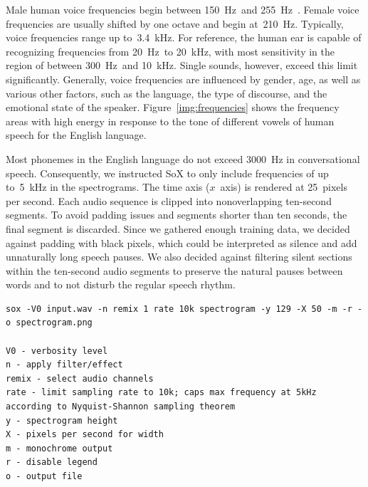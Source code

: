 	Male human voice frequencies begin between \SI{150}{\hertz}~and \SI{255}{\hertz}~\cite{traunmuller1993frequency}. Female voice frequencies are usually shifted by one octave and begin at~\SI{210}{\hertz}. Typically, voice frequencies range up to~\SI{3.4}{\kilo\hertz}. For reference, the human ear is capable of recognizing frequencies from \SI{20}{\hertz}~to \SI{20}{\kilo\hertz}, with most sensitivity in the region of between \SI{300}{\hertz}~and \SI{10}{\kilo\hertz}. Single sounds, however, exceed this limit significantly. Generally, voice frequencies are influenced by gender, age, as well as various other factors, such as the language, the type of discourse, and the emotional state of the speaker. Figure~\ref{img:frequencies} shows the frequency areas with high energy in response to the tone of different vowels of human speech for the English language.


Most phonemes in the English language do not exceed \SI{3000}{\hertz} in conversational speech.
Consequently, we instructed SoX to only include frequencies of up to~\SI{5}{\kilo\hertz} in the spectrograms.
The time axis ($x$~axis) is rendered at \num{25}~pixels per second. Each audio sequence is clipped into nonoverlapping ten-second segments. To avoid padding issues and segments shorter than ten seconds, the final segment is discarded. Since we gathered enough training data, we decided against padding with black pixels, which could be interpreted as silence and add unnaturally long speech pauses. We also decided against filtering silent sections within the ten-second audio segments to preserve the natural pauses between words and to not disturb the regular speech rhythm. 

	\begin{listing}[tp]
	\begin{lstlisting}[caption={SoX command and options used for generating monochrome spectrograms. All audio files were discretized into \num{129}~frequency buckets using a constant pixel width per time step, resulting in spectrogram images of $500 \times 129$ pixels.}, label={lst:spectrograms}]
sox -V0 input.wav -n remix 1 rate 10k spectrogram -y 129 -X 50 -m -r -o spectrogram.png

V0 - verbosity level 
n - apply filter/effect
remix - select audio channels
rate - limit sampling rate to 10k; caps max frequency at 5kHz according to Nyquist-Shannon sampling theorem
y - spectrogram height
X - pixels per second for width
m - monochrome output
r - disable legend
o - output file
    \end{lstlisting}
    \end{listing}
    
